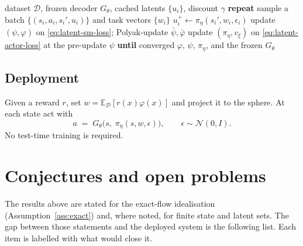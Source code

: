\documentclass[11pt]{article}
\theoremstyle{plain}
\theoremstyle{definition}
\theoremstyle{remark}
\newcommand{\D}{\mathcal D}
\newcommand{\E}{\mathbb E}
\newcommand{\1}{\mathbf 1}
\newcommand{\Gth}{G_\theta}
\begin{document}
\begin{algorithm}[t]
\caption{LatentFlowPSM pretraining (reward-free)}
\label{alg:latentflowpsm}
\begin{algorithmic}[1]
\Require dataset $\D$, frozen decoder $\Gth$, cached latents $\{u_i\}$, discount $\gamma$
\State \textbf{repeat}
\State \quad sample a batch $\{(s_i,a_i,s_i',u_i)\}$ and task vectors $\{w_i\}$
\State \quad $u_i^{+}\gets\pi_\eta(s_i',w_i,\epsilon_i)$
\State \quad update $(\psi,\varphi)$ on \eqref{eq:latent-sm-loss}; Polyak-update
       $\bar\psi,\bar\varphi$
\State \quad update $(\pi_\eta,v_\xi)$ on \eqref{eq:latent-actor-loss} at the pre-update
       $\psi$
\State \textbf{until} converged
\Ensure $\varphi$, $\psi$, $\pi_\eta$, and the frozen $\Gth$
\end{algorithmic}
\end{algorithm}

\subsection{Deployment}

Given a reward $r$, set $w=\E_\D[r(x)\varphi(x)]$ and project it to the sphere. At each
state act with
\[
  a \;=\; \Gth\big(s,\;\pi_\eta(s,w,\epsilon)\big),\qquad \epsilon\sim\mathcal N(0,I).
\]
No test-time training is required.

\section{Conjectures and open problems}
\label{sec:open}

The results above are stated for the exact-flow idealisation
(Assumption~\ref{ass:exact}) and, where noted, for finite state and latent sets. The gap
between those statements and the deployed system is the following list. Each item is
labelled with what would close it.
\end{document}
